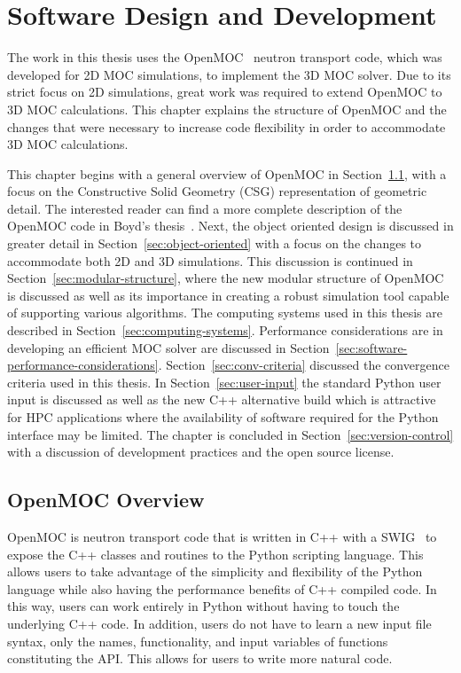 \chapter{Software Design and Development}
\label{chap:software-design}

The work in this thesis uses the OpenMOC~\cite{openmoc} neutron transport code, which was developed for 2D \ac{MOC} simulations, to implement the 3D \ac{MOC} solver. Due to its strict focus on 2D simulations, great work was required to extend OpenMOC to 3D \ac{MOC} calculations. This chapter explains the structure of OpenMOC and the changes that were necessary to increase code flexibility in order to accommodate 3D \ac{MOC} calculations. 

This chapter begins with a general overview of OpenMOC in Section~\ref{sec:openmoc-overview}, with a focus on the Constructive Solid Geometry (CSG) representation of geometric detail. The interested reader can find a more complete description of the OpenMOC code in Boyd's thesis~\cite{boyd2014openmoc}. Next, the object oriented design is discussed in greater detail in Section~\ref{sec:object-oriented} with a focus on the changes to accommodate both 2D and 3D simulations. This discussion is continued in Section~\ref{sec:modular-structure}, where the new modular structure of OpenMOC is discussed as well as its importance in creating a robust simulation tool capable of supporting various algorithms. The computing systems used in this thesis are described in Section~\ref{sec:computing-systems}. Performance considerations are in developing an efficient \ac{MOC} solver are discussed in Section~\ref{sec:software-performance-considerations}. Section~\ref{sec:conv-criteria} discussed the convergence criteria used in this thesis. In Section~\ref{sec:user-input} the standard Python user input is discussed as well as the new C++ alternative build which is attractive for \ac{HPC} applications where the availability of software required for the Python interface may be limited. The chapter is concluded in Section~\ref{sec:version-control} with a discussion of development practices and the open source license.

\section{OpenMOC Overview}
\label{sec:openmoc-overview}

OpenMOC is neutron transport code that is written in C++ with a \ac{SWIG}~\cite{swig} to expose the C++ classes and routines to the Python scripting language. This allows users to take advantage of the simplicity and flexibility of the Python language while also having the performance benefits of C++ compiled code. In this way, users can work entirely in Python without having to touch the underlying C++ code. In addition, users do not have to learn a new input file syntax, only the names, functionality, and input variables of functions constituting the \ac{API}. This allows for users to write more natural code.

